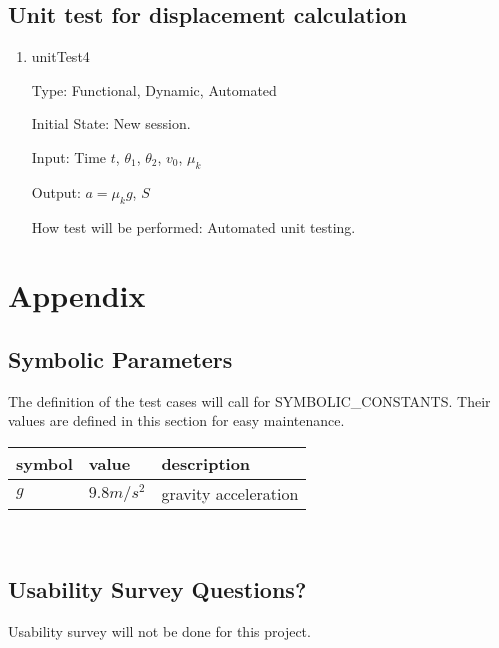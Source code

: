 \documentclass[12pt, titlepage]{article}
\begin{document}
\subsection{Unit test for displacement calculation}

\begin{enumerate}
	
	\item{unitTest4\\}
	
	Type: Functional, Dynamic, Automated
	
	Initial State: New session.
	
	Input: Time $t$, $\theta_{1}$, $\theta_{2}$, $v_{0}$, $\mu_{k}$
	
	Output: $a = \mu_{k}g$, $S$ 
	
	How test will be performed: Automated unit testing.
	
\end{enumerate}





\newpage

\section{Appendix}

\subsection{Symbolic Parameters}

The definition of the test cases will call for SYMBOLIC\_CONSTANTS.
Their values are defined in this section for easy maintenance.

\begin{tabular}{l l l} 
	\toprule		
	\textbf{symbol} & \textbf{value} & \textbf{description}\\
	\midrule 
	$g$ & $9.8 m/s^{2}$ & gravity acceleration\\	
	\bottomrule
\end{tabular}\\

\subsection{Usability Survey Questions?}

Usability survey will not be done for this project.
\end{document}

